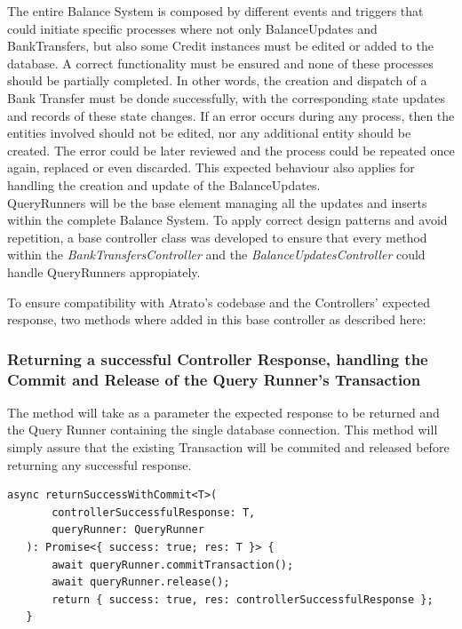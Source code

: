 The entire Balance System is composed by different events and triggers that could initiate specific processes where not only BalanceUpdates and BankTransfers, but also some Credit instances must be edited or added to the database. A correct functionality must be ensured and none of these processes should be partially completed. In other words, the creation and dispatch of a Bank Transfer must be donde successfully, with the corresponding state updates and records of these state changes. If an error occurs during any process, then the entities involved should not be edited, nor any additional entity should be created. The error could be later reviewed and the process could be repeated once again, replaced or even discarded. This expected behaviour also applies for handling the creation and update of the BalanceUpdates.\\

QueryRunners will be the base element managing all the updates and inserts within the complete Balance System. To apply correct design patterns and avoid repetition, a base controller class was developed to ensure that every method within the \textit{BankTransfersController} and the \textit{BalanceUpdatesController} could handle QueryRunners appropiately.

To ensure compatibility with Atrato's codebase and the Controllers' expected response, two methods where added in this base controller as described here: 

\subsubsection{Returning a successful Controller Response, handling the Commit and Release of the Query Runner's Transaction}

The method will take as a parameter the expected response to be returned and the Query Runner containing the single database connection. This method will simply assure that the existing Transaction will be commited and released before returning any successful response.

\begin{verbatim}
async returnSuccessWithCommit<T>(
       controllerSuccessfulResponse: T,
       queryRunner: QueryRunner
   ): Promise<{ success: true; res: T }> {
       await queryRunner.commitTransaction();
       await queryRunner.release();
       return { success: true, res: controllerSuccessfulResponse };
   }
\end{verbatim}

